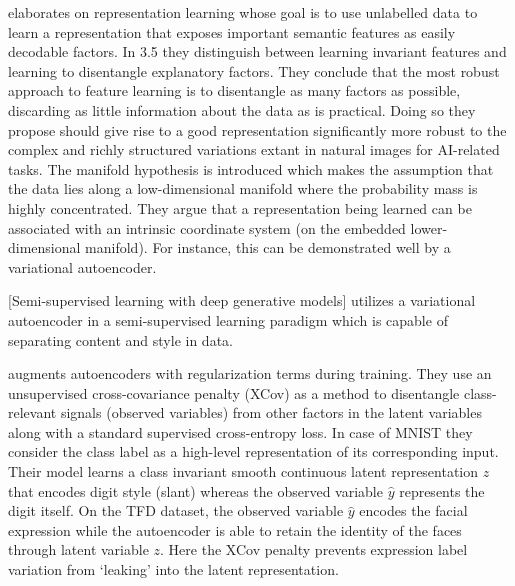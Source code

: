 \documentclass[10pt,letterpaper]{article}
\begin{document}
\par\cite{1206.5538} elaborates on representation learning whose goal is to use unlabelled data to learn a representation that exposes important semantic features as easily decodable factors. In 3.5 they distinguish between learning invariant features and learning to disentangle explanatory factors. They conclude that the most robust approach to feature learning is to disentangle as many factors as possible, discarding as little information about the data as is practical. Doing so they propose should give rise to a good representation significantly more robust to the complex and richly structured variations extant in natural images for AI-related tasks. The manifold hypothesis is introduced which makes the assumption that the data lies along a low-dimensional manifold where the probability mass is highly concentrated. They argue that a representation being learned can be associated with an intrinsic coordinate system (on the embedded lower-dimensional manifold). For instance, this can be demonstrated well by a variational autoencoder.

[Semi-supervised learning with deep generative models] utilizes a variational autoencoder in a semi-supervised learning paradigm which is capable of separating content and style in data.

\par\cite{1412.6583} augments autoencoders with regularization terms during training. They use an unsupervised cross-covariance penalty (XCov) as a method to disentangle class-relevant signals (observed variables) from other factors in the latent variables along with a standard supervised cross-entropy loss. In case of MNIST they consider the class label as a high-level representation of its corresponding input. Their model learns a class invariant smooth continuous latent representation $z$ that encodes digit style (slant) whereas the observed variable $\hat{y}$ represents the digit itself. On the TFD dataset, the observed variable $\hat{y}$ encodes the facial expression while the autoencoder is able to retain the identity of the faces through latent variable $z$. Here the XCov penalty prevents expression label variation from ‘leaking’ into the latent representation.
\end{document}

